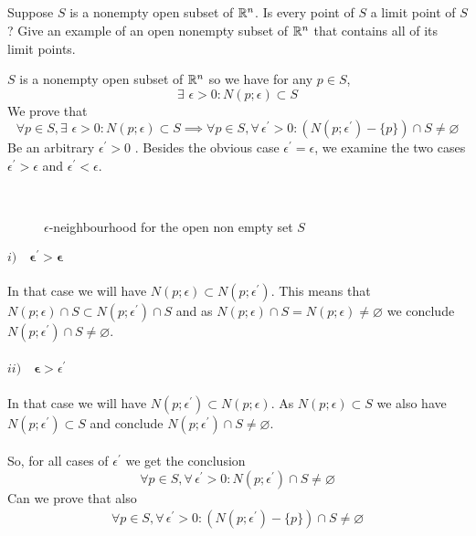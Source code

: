\subsection{}
\begin{tcolorbox}

Suppose $S$ is a nonempty open subset of $\mathbb{R}^n$. Is every point of $S$ a limit point of $S$? Give an example of an open nonempty subset of $\mathbb{R}^n$ that contains all of its limit points.
\end{tcolorbox}
$S$ is a nonempty open subset of $\mathbb{R}^n$ so we have for any $p\in S$,
$$\exists\, \, \epsilon>0: N(p;\epsilon)\subset S$$
We prove that 
$$\forall p\in S, \exists\, \, \epsilon>0: N(p;\epsilon)\subset S \implies \forall p\in S, \forall\, \epsilon^{'}>0: \left(N(p;\epsilon^{'})-\{p\}\right)\cap S\neq \varnothing $$
Be an arbitrary $\epsilon^{'}>0$ . Besides the obvious case $\epsilon^{'}=\epsilon$, we examine the two cases $\epsilon^{'}>\epsilon$ and $\epsilon^{'}<\epsilon$.\\\begin{figure}[H]%
    \centering
\\
\caption{$\epsilon$-neighbourhood for the open non empty set $S$   }
\label{fig:fig_p8a}
\end{figure}
$i)\quad \mathbf{\epsilon^{'}>\epsilon}$\\\\
In that case we will have $N(p;\epsilon)\subset N(p;\epsilon^{'})$. This means that $N(p;\epsilon)\cap S \subset N(p;\epsilon^{'})\cap S$ and as $N(p;\epsilon)\cap S = N(p;\epsilon)\neq \varnothing$ we conclude $N(p;\epsilon^{'})\cap S\neq \varnothing$.\\\\
$ii)\quad \mathbf{\epsilon}>\epsilon^{'}$\\\\
In that case we will have $N(p;\epsilon^{'})\subset N(p;\epsilon)$. As $N(p;\epsilon)\subset S$ we also have $N(p;\epsilon^{'})\subset S$ and conclude $N(p;\epsilon^{'})\cap S\neq \varnothing$.\\\\
So, for all cases of $\epsilon^{'}$ we get the conclusion 
$$\forall p\in S, \forall\, \epsilon^{'}>0: N(p;\epsilon^{'})\cap S\neq \varnothing $$ Can we prove that also
\begin{align}
\forall p\in S, \forall\, \epsilon^{'}>0: \left(N(p;\epsilon^{'})-\{p\}\right)\cap S\neq \varnothing
\end{align}
